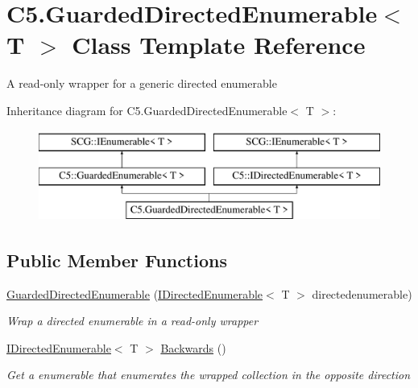 \hypertarget{class_c5_1_1_guarded_directed_enumerable}{}\section{C5.\+Guarded\+Directed\+Enumerable$<$ T $>$ Class Template Reference}
\label{class_c5_1_1_guarded_directed_enumerable}


A read-\/only wrapper for a generic directed enumerable  


Inheritance diagram for C5.\+Guarded\+Directed\+Enumerable$<$ T $>$\+:\begin{figure}[H]
\begin{center}
\leavevmode
\includegraphics[height=3.000000cm]{class_c5_1_1_guarded_directed_enumerable}
\end{center}
\end{figure}
\subsection*{Public Member Functions}
\begin{DoxyCompactItemize}
\item 
\hyperlink{class_c5_1_1_guarded_directed_enumerable_a2df0b6305f4f08aefe05e0e55887144c}{Guarded\+Directed\+Enumerable} (\hyperlink{interface_c5_1_1_i_directed_enumerable}{I\+Directed\+Enumerable}$<$ T $>$ directedenumerable)
\begin{DoxyCompactList}\small\item\em Wrap a directed enumerable in a read-\/only wrapper \end{DoxyCompactList}\item 
\hyperlink{interface_c5_1_1_i_directed_enumerable}{I\+Directed\+Enumerable}$<$ T $>$ \hyperlink{class_c5_1_1_guarded_directed_enumerable_a858ca7e55fc0cf083c967e31d9beb8eb}{Backwards} ()
\begin{DoxyCompactList}\small\item\em Get a enumerable that enumerates the wrapped collection in the opposite direction \end{DoxyCompactList}\end{DoxyCompactItemize}
